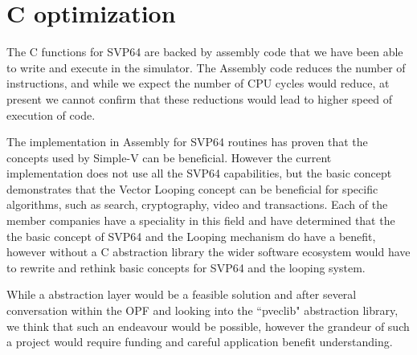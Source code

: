 \chapter{C optimization}

The C functions for SVP64 are backed by assembly code that we have been able to write and execute in the simulator.
The Assembly code reduces the number of instructions, and while we expect the number of CPU cycles would reduce,
at present we cannot confirm that these reductions would lead to higher speed of execution of code.

The implementation in Assembly for SVP64 routines has proven that the concepts used by Simple-V can be beneficial.
However the current implementation does not use all the SVP64 capabilities, but the basic concept demonstrates
that the Vector Looping concept can be beneficial for specific algorithms, such as search, cryptography, video
and transactions.
Each of the member companies have a speciality in this field and have determined that the the basic concept of
SVP64 and the Looping mechanism do have a benefit, however without a C abstraction library the wider software
ecosystem would have to rewrite and rethink basic concepts for SVP64 and the looping system.

While a abstraction layer would be a feasible solution and after several conversation within the \acrshort{OPF}
and looking into the ``pveclib" abstraction library, we think that such an endeavour would be possible,
however the grandeur of such a project would require funding and careful application benefit understanding.
